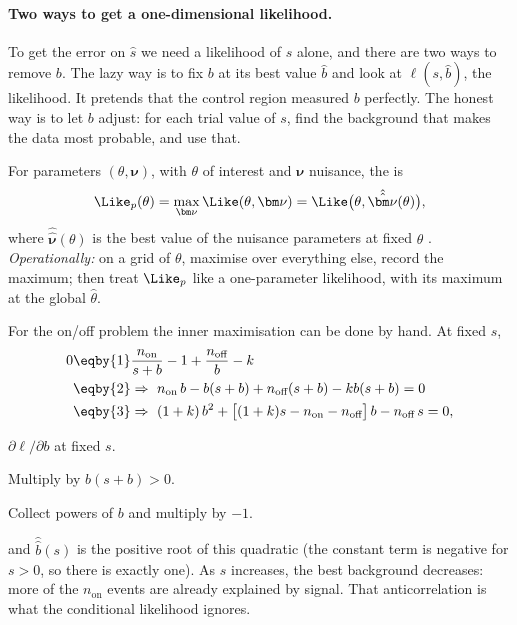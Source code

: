 \paragraph{Two ways to get a one-dimensional likelihood.}
To get the error on $\hat s$ we need a likelihood of $s$ alone, and there
are two ways to remove $b$. The lazy way is to fix $b$ at its best value
$\hat b$ and look at $\ell(s,\hat b)$, the 
likelihood. It pretends that the control region measured $b$ perfectly. The
honest way is to let $b$ adjust: for each trial value of $s$, find the
background that makes the data most probable, and use that.

\begin{workdef}
For parameters $(\theta,\bm\nu)$, with $\theta$ of interest and $\bm\nu$
nuisance, the  is
\[
  \Like_p(\theta)=\max_{\bm\nu}\Like(\theta,\bm\nu)
  =\Like\bigl(\theta,\hat{\hat{\bm\nu}}(\theta)\bigr),
\]
where $\hat{\hat{\bm\nu}}(\theta)$ is the best value of the nuisance
parameters at fixed $\theta$ . \emph{Operationally:} on a grid of $\theta$,
maximise over everything else, record the maximum; then treat $\Like_p$ like
a one-parameter likelihood, with its maximum at the global $\hat\theta$.
\end{workdef}

For the on/off problem the inner maximisation can be done by hand. At fixed
$s$,
\begin{align*}
  0&\eqby{1}\frac{n_{\text{on}}}{s+b}-1+\frac{n_{\text{off}}}{b}-k\\
   &\eqby{2}\Rightarrow\ n_{\text{on}}\,b-b(s+b)+n_{\text{off}}(s+b)-kb(s+b)=0\\
   &\eqby{3}\Rightarrow\ (1+k)\,b^2+\bigl[(1+k)s-n_{\text{on}}-n_{\text{off}}\bigr]\,b-n_{\text{off}}\,s=0,
\end{align*}
\begin{explain}
  \item $\partial\ell/\partial b$ at fixed $s$.
  \item Multiply by $b(s+b)>0$.
  \item Collect powers of $b$ and multiply by $-1$.
\end{explain}
and $\hat{\hat b}(s)$ is the positive root of this quadratic (the constant
term is negative for $s>0$, so there is exactly one). As $s$ increases, the
best background decreases: more of the $n_{\text{on}}$ events are already
explained by signal. That anticorrelation is what the conditional likelihood
ignores.

